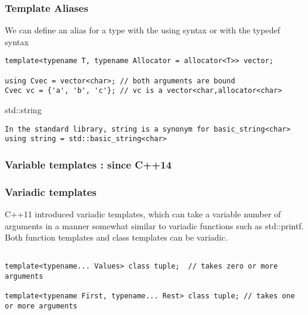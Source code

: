 \documentclass{beamer}
\begin{document}
\begin{frame}[fragile]
\frametitle{Template Aliases}
We can define an alias for a type with the using syntax or with the typedef syntax

\begin{lstlisting}
template<typename T, typename Allocator = allocator<T>> vector;

using Cvec = vector<char>; // both arguments are bound
Cvec vc = {'a', 'b', 'c'}; // vc is a vector<char,allocator<char>
\end{lstlisting}

\begin{block} {std::string}
\begin{lstlisting}
In the standard library, string is a synonym for basic_string<char>
using string = std::basic_string<char>
\end{lstlisting}
\end{block}

\end{frame}

\begin{frame}
\frametitle{Variable templates : since C++14}

\end{frame}


\begin{frame}[fragile]
\frametitle{Variadic templates}
C++11 introduced variadic templates, which can take a variable 
number of arguments in a manner somewhat similar to variadic 
functions such as std::printf. 
Both function templates and class templates can be variadic.
\begin{lstlisting}

template<typename... Values> class tuple;  // takes zero or more arguments

template<typename First, typename... Rest> class tuple; // takes one or more arguments
\end{lstlisting}

\end{frame}
\end{document}
